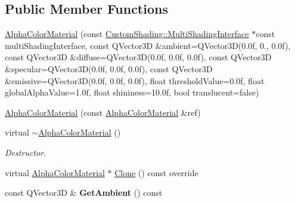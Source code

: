 \subsection*{Public Member Functions}
\begin{DoxyCompactItemize}
\item 
\mbox{\hyperlink{class_geometry_engine_1_1_geometry_material_1_1_alpha_color_material_ac735b5c0916ee378ab1615bf4d90813c}{Alpha\+Color\+Material}} (const \mbox{\hyperlink{class_geometry_engine_1_1_custom_shading_1_1_multi_shading_interface}{Custom\+Shading\+::\+Multi\+Shading\+Interface}} $\ast$const multi\+Shading\+Interface, const Q\+Vector3D \&ambient=Q\+Vector3D(0.\+0f, 0., 0.\+0f), const Q\+Vector3\+D \&diffuse=\+Q\+Vector3\+D(0.\+0f, 0.\+0f, 0.\+0f), const Q\+Vector3\+D \&specular=\+Q\+Vector3\+D(0.\+0f, 0.\+0f, 0.\+0f), const Q\+Vector3\+D \&emissive=\+Q\+Vector3\+D(0.\+0f, 0.\+0f, 0.\+0f), float threshold\+Value=0.\+0f, float global\+Alpha\+Value=1.\+0f, float shininess=10.\+0f, bool translucent=false)
\item 
\mbox{\hyperlink{class_geometry_engine_1_1_geometry_material_1_1_alpha_color_material_aa7ae35b575575646ddc88cb95dd4a8b4}{Alpha\+Color\+Material}} (const \mbox{\hyperlink{class_geometry_engine_1_1_geometry_material_1_1_alpha_color_material}{Alpha\+Color\+Material}} \&ref)
\item 
\mbox{\label{class_geometry_engine_1_1_geometry_material_1_1_alpha_color_material_afd1fa560c390f48a95d7c6574cbdfcca}} 
virtual \mbox{\hyperlink{class_geometry_engine_1_1_geometry_material_1_1_alpha_color_material_afd1fa560c390f48a95d7c6574cbdfcca}{$\sim$\+Alpha\+Color\+Material}} ()
\begin{DoxyCompactList}\small\item\em Destructor. \end{DoxyCompactList}\item 
virtual \mbox{\hyperlink{class_geometry_engine_1_1_geometry_material_1_1_alpha_color_material}{Alpha\+Color\+Material}} $\ast$ \mbox{\hyperlink{class_geometry_engine_1_1_geometry_material_1_1_alpha_color_material_a932e340f71f7afd3088a44c29560744c}{Clone}} () const override
\item 
\mbox{\label{class_geometry_engine_1_1_geometry_material_1_1_alpha_color_material_aa0612c081b76090445a0486392a44c6e}} 
const Q\+Vector3D \& {\bfseries Get\+Ambient} () const

\end{DoxyCompactItemize}
